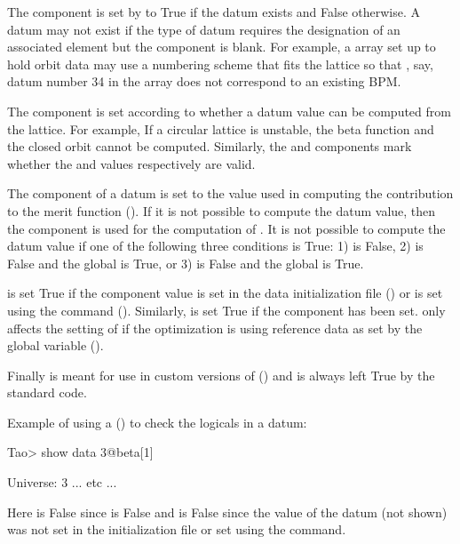 The  component is set by \tao to True if the datum exists and False otherwise. A datum
may not exist if the type of datum requires the designation of an associated element but the
 component is blank. For example, a  array set up to hold orbit data may
use a numbering scheme that fits the lattice so that , say, datum number 34 in the array does not
correspond to an existing BPM.

The  component is set according to whether a datum value can be computed from the
 lattice. For example, If a circular lattice is unstable, the beta function and the closed
orbit cannot be computed. Similarly, the  and  components mark whether
the  and  values respectively are valid.

The  component of a datum is set to the  value used in computing the
contribution to the merit function (). If it is not possible to compute
the datum value, then the  component is used for the computation of .
It is not possible to compute the datum value if one of the following three conditions is True: 1)
 is False, 2)  is False and the global  is True, or
3)  is False and the global  is True.

 is set True if the  component value is set in the data initialization file
() or is set using the  command (). Similarly, 
is set True if the  component has been set.  only affects the setting of
 if the optimization is using reference data as set by the global variable
 ().

Finally  is meant for use in custom versions of \tao () and is
always left True by the standard \tao code.

Example of using a  () to check the logicals
in a datum:
\begin{example}
  Tao> show data 3@beta[1]

  Universe:   3
      ... etc ...
\end{example}
Here  is False since  is False and  is False since the
 value of the datum (not shown) was not set in the \tao initialization file or set using
the  command.

